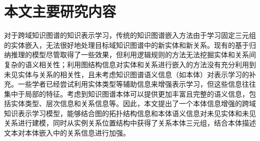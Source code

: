 


\section{本文主要研究内容}
对于跨域知识图谱的知识表示学习，传统的知识图谱嵌入方法由于学习固定三元组的实体嵌入，无法很好地处理目标域知识图谱中的新实体和新关系。现有的基于归纳推理的模型尽管取得了一些效果，但利用逻辑规则的方法无法挖掘实体和关系间复杂的语义相关性；利用图结构信息对实体和关系进行嵌入的方法没有充分利用到未见实体与关系的相关性，且未考虑知识图谱语义信息（如本体）对表示学习的补充。一些学者已经尝试利用实体类型等辅助信息来增强表示学习，但这些信息往往集中于局部的特征。考虑到知识图谱本体可以提供更加丰富且完整的语义信息，包括实体类型、层次信息和关系信息等。因此，本文提出了一个本体信息增强的跨域知识表示学习模型，能够结合图的拓扑结构信息和本体语义信息对未见实体和未见关系进行建模，同时从实例关系位置结构中获得了关系本体三元组，结合本体描述文本对本体嵌入中的关系信息进行加强。

